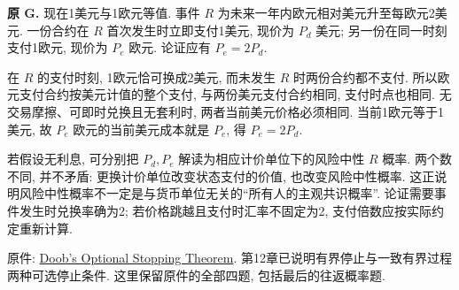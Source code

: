 \begin{exercise}\label{ex:P10.G}\label{part:P10.G}
\textbf{原 G.} 现在1美元与1欧元等值. 事件 $R$ 为未来一年内欧元相对美元升至每欧元2美元. 一份合约在 $R$ 首次发生时立即支付1美元, 现价为 $P_d$ 美元; 另一份在同一时刻支付1欧元, 现价为 $P_e$ 欧元. 论证应有 $P_e=2P_d$.
\end{exercise}
\begin{solution}\label{sol:P10.G}
在 $R$ 的支付时刻, 1欧元恰可换成2美元, 而未发生 $R$ 时两份合约都不支付. 所以欧元支付合约按美元计值的整个支付, 与两份美元支付合约相同, 支付时点也相同. 无交易摩擦、可即时兑换且无套利时, 两者当前美元价格必须相同. 当前1欧元等于1美元, 故 $P_e$ 欧元的当前美元成本就是 $P_e$, 得 $P_e=2P_d$.

若假设无利息, 可分别把 $P_d,P_e$ 解读为相应计价单位下的风险中性 $R$ 概率. 两个数不同, 并不矛盾: 更换计价单位改变状态支付的价值, 也改变风险中性概率. 这正说明风险中性概率不一定是与货币单位无关的“所有人的主观共识概率”. 论证需要事件发生时兑换率确为2; 若价格跳越且支付时汇率不固定为2, 支付倍数应按实际约定重新计算.
\end{solution}

原件: \href{https://ocw.mit.edu/courses/18-600-probability-and-random-variables-fall-2019/resources/mit18_600f19_pset_note/}{Doob's Optional Stopping Theorem}. 第12章已说明有界停止与一致有界过程两种可选停止条件. 这里保留原件的全部四题, 包括最后的往返概率题.

